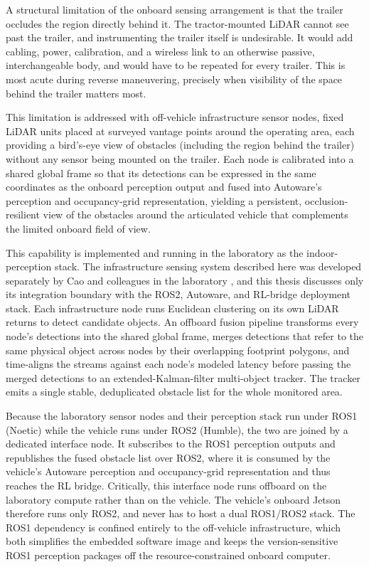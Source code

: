 A structural limitation of the onboard sensing arrangement is that the trailer occludes the region directly behind it. The tractor-mounted LiDAR cannot see past the trailer, and instrumenting the trailer itself is undesirable. It would add cabling, power, calibration, and a wireless link to an otherwise passive, interchangeable body, and would have to be repeated for every trailer. This is most acute during reverse maneuvering, precisely when visibility of the space behind the trailer matters most.

This limitation is addressed with off-vehicle infrastructure sensor nodes, fixed LiDAR units placed at surveyed vantage points around the operating area, each providing a bird's-eye view of obstacles (including the region behind the trailer) without any sensor being mounted on the trailer. Each node is calibrated into a shared global frame so that its detections can be expressed in the same coordinates as the onboard perception output and fused into Autoware's perception and occupancy-grid representation, yielding a persistent, occlusion-resilient view of the obstacles around the articulated vehicle that complements the limited onboard field of view.

This capability is implemented and running in the laboratory as the indoor-perception stack. The infrastructure sensing system described here was developed separately by Cao and colleagues in the laboratory \cite{cao2023infrastructure}, and this thesis discusses only its integration boundary with the ROS2, Autoware, and RL-bridge deployment stack. Each infrastructure node runs Euclidean clustering on its own LiDAR returns to detect candidate objects. An offboard fusion pipeline transforms every node's detections into the shared global frame, merges detections that refer to the same physical object across nodes by their overlapping footprint polygons, and time-aligns the streams against each node's modeled latency before passing the merged detections to an extended-Kalman-filter multi-object tracker. The tracker emits a single stable, deduplicated obstacle list for the whole monitored area.

Because the laboratory sensor nodes and their perception stack run under ROS1 (Noetic) while the vehicle runs under ROS2 (Humble), the two are joined by a dedicated interface node. It subscribes to the ROS1 perception outputs and republishes the fused obstacle list over ROS2, where it is consumed by the vehicle's Autoware perception and occupancy-grid representation and thus reaches the RL bridge. Critically, this interface node runs offboard on the laboratory compute rather than on the vehicle. The vehicle's onboard Jetson therefore runs only ROS2, and never has to host a dual ROS1/ROS2 stack. The ROS1 dependency is confined entirely to the off-vehicle infrastructure, which both simplifies the embedded software image and keeps the version-sensitive ROS1 perception packages off the resource-constrained onboard computer.

